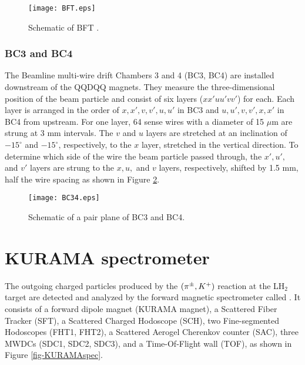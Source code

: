 \begin{figure}[!h]
 \begin{center}
   \texttt{[image: BFT.eps]}
   \caption{Schematic of BFT \cite{Honda-D}.}
   \label{fig-BFT}
 \end{center}
\end{figure}

%
\subsubsection{BC3 and BC4}
The Beamline multi-wire drift Chambers 3 and 4 (BC3, BC4) are installed downstream of the QQDQQ magnets. They measure the three-dimensional position of the beam particle and consist of six layers ($xx'uu'vv'$) for each. Each layer is arranged in the order of $x, x', v, v', u, u'$ in BC3 and $u, u', v, v', x, x'$ in BC4 from upstream. For one layer, 64 sense wires with a diameter of 15 $\mu$m are strung at 3 mm intervals. The $v$ and $u$ layers are stretched at an inclination of $-15^{\circ}$ and $-15^{\circ}$, respectively, to the $x$ layer, stretched in the vertical direction. To determine which side of the wire the beam particle passed through, the $x', u',$ and $v'$ layers are strung to the $x, u,$ and $v$ layers, respectively, shifted by 1.5 mm, half the wire spacing as shown in Figure \ref{fig-BC34}.

\begin{figure}[!h]
 \begin{center}
   \texttt{[image: BC34.eps]}
   \caption{Schematic of a pair plane of BC3 and BC4.}
   \label{fig-BC34}
 \end{center}
\end{figure}


\clearpage
\section{KURAMA spectrometer}
The outgoing charged particles produced by the $(\pi^{\pm},K^+)$ reaction at the LH$_2$ target are detected and analyzed by the forward magnetic spectrometer called . It consists of a forward dipole magnet (KURAMA magnet), a Scattered Fiber Tracker (SFT), a Scattered Charged Hodoscope (SCH), two Fine-segmented Hodoscopes (FHT1, FHT2), a Scattered Aerogel Cherenkov counter (SAC), three MWDCs (SDC1, SDC2, SDC3), and a Time-Of-Flight wall (TOF), as shown in Figure \ref{fig-KURAMAspec}.


